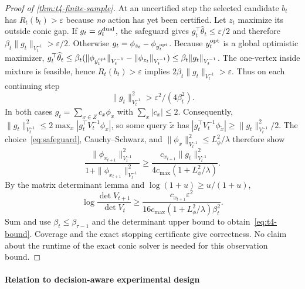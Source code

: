 \documentclass{article}
\theoremstyle{plain}
\theoremstyle{definition}
\begin{document}
\begin{proof}[Proof of \cref{thm:t4-finite-sample}]
At an uncertified step the selected candidate $b_t$ has
$R_t(b_t)>\varepsilon$ because \emph{no} action has yet been certified.
Let $z_t$ maximize its outside conic gap. If
$g_t=g_t^{\rm dual}$, the safeguard gives
$g_t^\top\widehat\theta_t\le\varepsilon/2$ and therefore
$\beta_t\|g_t\|_{V_t^{-1}}>\varepsilon/2$.
Otherwise $g_t=\phi_{z_t}-\phi_{y_t^{\rm opt}}$.
Because $y_t^{\rm opt}$ is a global optimistic maximizer,
$g_t^\top\widehat\theta_t\le
\beta_t(\|\phi_{y_t^{\rm opt}}\|_{V_t^{-1}}
-\|\phi_{z_t}\|_{V_t^{-1}})
\le\beta_t\|g_t\|_{V_t^{-1}}$.
The one-vertex inside mixture is feasible, hence
$R_t(b_t)>\varepsilon$ implies
$2\beta_t\|g_t\|_{V_t^{-1}}>\varepsilon$.
Thus on each continuing step
\begin{equation}
\|g_t\|_{V_t^{-1}}^2>\varepsilon^2/(4\beta_t^2).
\label{eq:cd-width-lemma}
\end{equation}
In both cases $g_t=\sum_{x\in Z}c_x\phi_x$ with
$\sum_x|c_x|\le2$. Consequently,
$\|g_t\|_{V_t^{-1}}^2\le
2\max_x|g_t^\top V_t^{-1}\phi_x|$, so some query
$\widetilde x$ has
$|g_t^\top V_t^{-1}\phi_{\widetilde x}|\ge
\|g_t\|_{V_t^{-1}}^2/2$.
The choice~\eqref{eq:safeguard}, Cauchy--Schwarz, and
$\|\phi_x\|_{V_t^{-1}}^2\le L_\phi^2/\lambda$
therefore show
\[
\frac{\|\phi_{x_{t+1}}\|_{V_t^{-1}}^2}
{1+\|\phi_{x_{t+1}}\|_{V_t^{-1}}^2}
\ge\frac{c_{x_{t+1}}\|g_t\|_{V_t^{-1}}^2}
{4c_{\max}(1+L_\phi^2/\lambda)}.
\]
By the matrix determinant lemma and
$\log(1+u)\ge u/(1+u)$,
\[
\log\frac{\det V_{t+1}}{\det V_t}\ge
\frac{c_{x_{t+1}}\varepsilon^2}
{16c_{\max}(1+L_\phi^2/\lambda)\beta_t^2}.
\]
Sum and use $\beta_t\le\beta_{\tau-1}$ and the determinant
upper bound to obtain~\eqref{eq:t4-bound}. Coverage and the exact
stopping certificate give correctness. No claim about the runtime of
the exact conic solver is needed for this observation bound.
\end{proof}

\paragraph{Relation to decision-aware experimental design}
\end{document}
